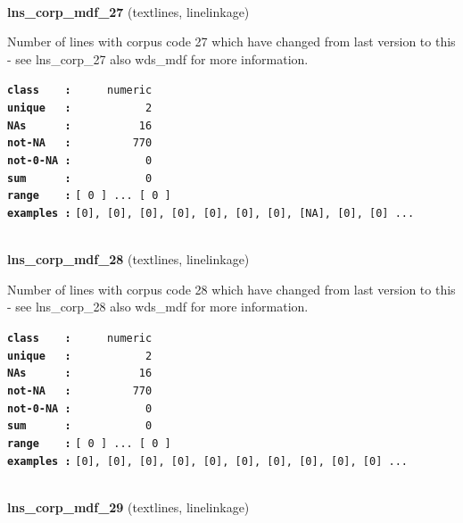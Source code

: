 \documentclass[]{article}
\begin{document}
~

\textbf{lns\_corp\_mdf\_27} (textlines, linelinkage)

Number of lines with corpus code 27 which have changed from last version
to this - see lns\_corp\_27 also wds\_mdf for more information.

\textbf{\texttt{class\ \ \ \ :}} \texttt{~~~~~numeric}\\
\textbf{\texttt{unique\ \ \ :}} \texttt{~~~~~~~~~~~2}\\
\textbf{\texttt{NAs\ \ \ \ \ \ :}} \texttt{~~~~~~~~~~16}\\
\textbf{\texttt{not-NA\ \ \ :}} \texttt{~~~~~~~~~770}\\
\textbf{\texttt{not-0-NA\ :}} \texttt{~~~~~~~~~~~0}\\
\textbf{\texttt{sum\ \ \ \ \ \ :}} \texttt{~~~~~~~~~~~0}\\
\textbf{\texttt{range\ \ \ \ :}}
\texttt{{[}\ 0\ {]}\ ...\ {[}\ 0\ {]}}\\
\textbf{\texttt{examples\ :}}
\texttt{{[}0{]},\ {[}0{]},\ {[}0{]},\ {[}0{]},\ {[}0{]},\ {[}0{]},\ {[}0{]},\ {[}NA{]},\ {[}0{]},\ {[}0{]}\ ...}\\

~

\textbf{lns\_corp\_mdf\_28} (textlines, linelinkage)

Number of lines with corpus code 28 which have changed from last version
to this - see lns\_corp\_28 also wds\_mdf for more information.

\textbf{\texttt{class\ \ \ \ :}} \texttt{~~~~~numeric}\\
\textbf{\texttt{unique\ \ \ :}} \texttt{~~~~~~~~~~~2}\\
\textbf{\texttt{NAs\ \ \ \ \ \ :}} \texttt{~~~~~~~~~~16}\\
\textbf{\texttt{not-NA\ \ \ :}} \texttt{~~~~~~~~~770}\\
\textbf{\texttt{not-0-NA\ :}} \texttt{~~~~~~~~~~~0}\\
\textbf{\texttt{sum\ \ \ \ \ \ :}} \texttt{~~~~~~~~~~~0}\\
\textbf{\texttt{range\ \ \ \ :}}
\texttt{{[}\ 0\ {]}\ ...\ {[}\ 0\ {]}}\\
\textbf{\texttt{examples\ :}}
\texttt{{[}0{]},\ {[}0{]},\ {[}0{]},\ {[}0{]},\ {[}0{]},\ {[}0{]},\ {[}0{]},\ {[}0{]},\ {[}0{]},\ {[}0{]}\ ...}\\

~

\textbf{lns\_corp\_mdf\_29} (textlines, linelinkage)
\end{document}
